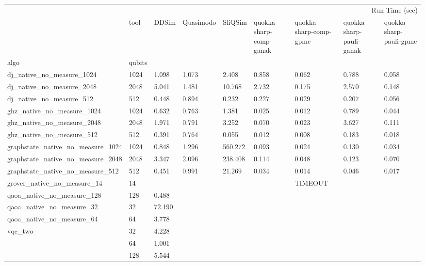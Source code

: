 \begin{tabular}{lllllllll}
\toprule
 &  & \multicolumn{7}{r}{Run Time (sec)} \\
 & tool & DDSim & Quasimodo & SliQSim & quokka-sharp-comp-ganak & quokka-sharp-comp-gpmc & quokka-sharp-pauli-ganak & quokka-sharp-pauli-gpmc \\
algo & qubits &  &  &  &  &  &  &  \\
\midrule
dj_native_no_measure_1024 & 1024 & 1.098 & 1.073 & 2.408 & 0.858 & 0.062 & 0.788 & 0.058 \\
\cline{1-9}
dj_native_no_measure_2048 & 2048 & 5.041 & 1.481 & 10.768 & 2.732 & 0.175 & 2.570 & 0.148 \\
\cline{1-9}
dj_native_no_measure_512 & 512 & 0.448 & 0.894 & 0.232 & 0.227 & 0.029 & 0.207 & 0.056 \\
\cline{1-9}
ghz_native_no_measure_1024 & 1024 & 0.632 & 0.763 & 1.381 & 0.025 & 0.012 & 0.789 & 0.044 \\
\cline{1-9}
ghz_native_no_measure_2048 & 2048 & 1.971 & 0.791 & 3.252 & 0.070 & 0.023 & 3.627 & 0.111 \\
\cline{1-9}
ghz_native_no_measure_512 & 512 & 0.391 & 0.764 & 0.055 & 0.012 & 0.008 & 0.183 & 0.018 \\
\cline{1-9}
graphstate_native_no_measure_1024 & 1024 & 0.848 & 1.296 & 560.272 & 0.093 & 0.024 & 0.130 & 0.034 \\
\cline{1-9}
graphstate_native_no_measure_2048 & 2048 & 3.347 & 2.096 & 238.408 & 0.114 & 0.048 & 0.123 & 0.070 \\
\cline{1-9}
graphstate_native_no_measure_512 & 512 & 0.451 & 0.991 & 21.269 & 0.034 & 0.014 & 0.046 & 0.017 \\
\cline{1-9}
grover_native_no_measure_14 & 14 &  &  &  &  & TIMEOUT &  &  \\
\cline{1-9}
qaoa_native_no_measure_128 & 128 & 0.488 &  &  &  &  &  &  \\
\cline{1-9}
qaoa_native_no_measure_32 & 32 & 72.190 &  &  &  &  &  &  \\
\cline{1-9}
qaoa_native_no_measure_64 & 64 & 3.778 &  &  &  &  &  &  \\
\cline{1-9}
\multirow[t]{3}{*}{vqe_two} & 32 & 4.228 &  &  &  &  &  &  \\
 & 64 & 1.001 &  &  &  &  &  &  \\
 & 128 & 5.544 &  &  &  &  &  &  \\
\cline{1-9}
\bottomrule
\end{tabular}
